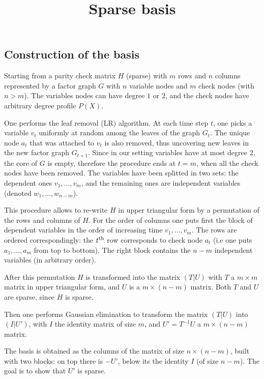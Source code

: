 \documentclass{article}
\begin{document}

\title{Sparse basis}
\maketitle

\subsection*{Construction of the basis}

Starting from a parity check matrix $H$ (sparse) with $m$ rows and $n$ columns represented by a factor graph $G$ with $n$ variable nodes and $m$ check nodes (with $n>m$). The variables nodes can have degree $1$ or $2$, and the check nodes have arbitrary degree profile $P(X)$. 

One performs the leaf removal (LR) algorithm. At each time step $t$, one picks a variable $v_t$ uniformly at random among the leaves of the graph $G_t$. The unique node $a_t$ that was attached to $v_t$ is also removed, thus uncovering new leaves in the new factor graph $G_{t+1}$. Since in our setting variables have at most degree $2$, the core of $G$ is empty, therefore the procedure ends at $t=m$, when all the check nodes have been removed. The variables have been splitted in two sets: the dependent ones $v_1, \dots, v_m$, and the remaining ones are independent variables (denoted $w_1,\dots,w_{n-m}$).

This procedure allows to re-write $H$ in upper triangular form by a permutation of the rows and columns of $H$. For the order of columns one puts first the block of dependent variables in the order of increasing time $v_1,\dots,v_m$. The rows are ordered correspondingly: the $t^{\rm th}$ row corresponds to check node $a_t$ (i.e one puts $a_1,\dots,a_m$ from top to bottom). The right block contains the $n-m$ independent variables (in arbitrary order).

After this permutation $H$ is transformed into the matrix $(T|U)$ with $T$ a $m\times m$ matrix in upper triangular form, and $U$ is a $m\times(n-m)$ matrix. Both $T$ and $U$ are sparse, since $H$ is sparse.

Then one performs Gaussian elimination to transform the matrix $(T|U)$ into $(I|U')$, with $I$ the identity matrix of size $m$, and $U'=T^{-1}U$ a $m\times (n-m)$ matrix. 

The basis is obtained as the columns of the matrix of size $n\times(n-m)$, built with two blocks: on top there is $-U'$, below its the identity $I$ (of size $n-m$). The goal is to show that $U'$ is sparse. 
\end{document}
